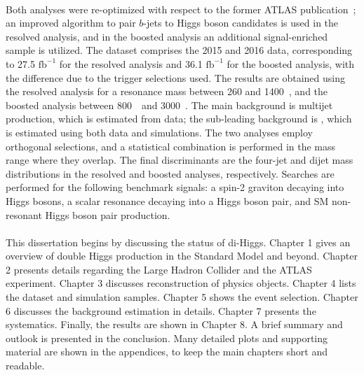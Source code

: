 \paragraph{}
Both analyses were re-optimized with respect to the former ATLAS publication~\cite{EXOT-2015-11}; an improved algorithm to pair $b$-jets to Higgs boson candidates is used in the resolved analysis, and in the boosted analysis an additional signal-enriched sample is utilized. 
The dataset comprises the 2015 and 2016 data, corresponding to 27.5 $\mathrm{fb}^{-1}$ for the resolved analysis and 36.1 $\mathrm{fb}^{-1}$ for the boosted analysis, with the difference due to the trigger selections used. 
The results are obtained using the resolved analysis for a resonance mass between 260 and 1400~\GeV, and the boosted analysis between 800~\GeV\ and 3000~\GeV. 
The main background is multijet production, which is estimated from data; the sub-leading background is \ttbar, which is estimated using both data and simulations. 
The two analyses employ orthogonal selections, and a statistical combination is performed in the mass range where they overlap. 
The final discriminants are the four-jet and dijet mass distributions in the resolved and boosted analyses, respectively. 
Searches are performed for the following benchmark signals: a spin-2 graviton decaying into Higgs bosons, a scalar resonance decaying into a Higgs boson pair, and SM non-resonant Higgs boson pair production.

\paragraph{}
This dissertation begins by discussing the status of di-Higgs. 
Chapter 1 gives an overview of double Higgs production in the Standard Model and beyond. 
Chapter 2 presents details regarding the Large Hadron Collider and the ATLAS experiment. 
Chapter 3 discusses reconstruction of physics objects. 
Chapter 4 lists the dataset and simulation samples. 
Chapter 5 shows the event selection.
Chapter 6 discusses the background estimation in details.
Chapter 7 presents the systematics.
Finally, the results are shown in Chapter 8.
A brief summary and outlook is presented in the conclusion.
Many detailed plots and supporting material are shown in the appendices, to keep the main chapters short and readable.


